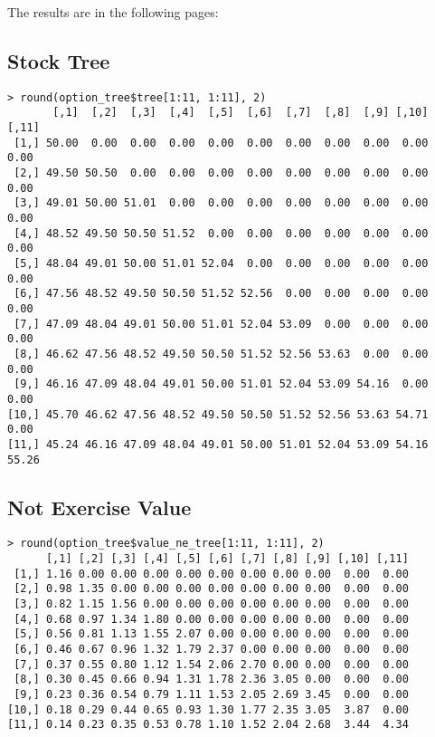 \documentclass[11pt]{scrartcl}
\begin{document}
The results are in the following pages:

\begin{landscape}

\subsection{Stock Tree}

\begin{lstlisting}
> round(option_tree$tree[1:11, 1:11], 2)
       [,1]  [,2]  [,3]  [,4]  [,5]  [,6]  [,7]  [,8]  [,9] [,10] [,11]
 [1,] 50.00  0.00  0.00  0.00  0.00  0.00  0.00  0.00  0.00  0.00  0.00
 [2,] 49.50 50.50  0.00  0.00  0.00  0.00  0.00  0.00  0.00  0.00  0.00
 [3,] 49.01 50.00 51.01  0.00  0.00  0.00  0.00  0.00  0.00  0.00  0.00
 [4,] 48.52 49.50 50.50 51.52  0.00  0.00  0.00  0.00  0.00  0.00  0.00
 [5,] 48.04 49.01 50.00 51.01 52.04  0.00  0.00  0.00  0.00  0.00  0.00
 [6,] 47.56 48.52 49.50 50.50 51.52 52.56  0.00  0.00  0.00  0.00  0.00
 [7,] 47.09 48.04 49.01 50.00 51.01 52.04 53.09  0.00  0.00  0.00  0.00
 [8,] 46.62 47.56 48.52 49.50 50.50 51.52 52.56 53.63  0.00  0.00  0.00
 [9,] 46.16 47.09 48.04 49.01 50.00 51.01 52.04 53.09 54.16  0.00  0.00
[10,] 45.70 46.62 47.56 48.52 49.50 50.50 51.52 52.56 53.63 54.71  0.00
[11,] 45.24 46.16 47.09 48.04 49.01 50.00 51.01 52.04 53.09 54.16 55.26
\end{lstlisting}

\subsection{Not Exercise Value}

\begin{lstlisting}
> round(option_tree$value_ne_tree[1:11, 1:11], 2)
      [,1] [,2] [,3] [,4] [,5] [,6] [,7] [,8] [,9] [,10] [,11]
 [1,] 1.16 0.00 0.00 0.00 0.00 0.00 0.00 0.00 0.00  0.00  0.00
 [2,] 0.98 1.35 0.00 0.00 0.00 0.00 0.00 0.00 0.00  0.00  0.00
 [3,] 0.82 1.15 1.56 0.00 0.00 0.00 0.00 0.00 0.00  0.00  0.00
 [4,] 0.68 0.97 1.34 1.80 0.00 0.00 0.00 0.00 0.00  0.00  0.00
 [5,] 0.56 0.81 1.13 1.55 2.07 0.00 0.00 0.00 0.00  0.00  0.00
 [6,] 0.46 0.67 0.96 1.32 1.79 2.37 0.00 0.00 0.00  0.00  0.00
 [7,] 0.37 0.55 0.80 1.12 1.54 2.06 2.70 0.00 0.00  0.00  0.00
 [8,] 0.30 0.45 0.66 0.94 1.31 1.78 2.36 3.05 0.00  0.00  0.00
 [9,] 0.23 0.36 0.54 0.79 1.11 1.53 2.05 2.69 3.45  0.00  0.00
[10,] 0.18 0.29 0.44 0.65 0.93 1.30 1.77 2.35 3.05  3.87  0.00
[11,] 0.14 0.23 0.35 0.53 0.78 1.10 1.52 2.04 2.68  3.44  4.34
\end{lstlisting}


\end{landscape}
\end{document}
